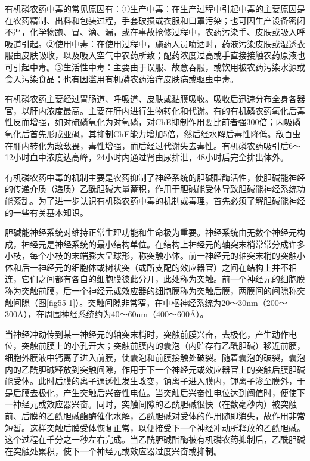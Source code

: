 有机磷农药中毒的常见原因有：①生产中毒：在生产过程中引起中毒的主要原因是在农药精制、出料和包装过程，手套破损或衣服和口罩污染；也可因生产设备密闭不严，化学物跑、冒、滴、漏，或在事故抢修过程中，农药污染手、皮肤或吸入呼吸道引起。②使用中毒：在使用过程中，施药人员喷洒时，药液污染皮肤或湿透衣服由皮肤吸收，以及吸入空气中农药所致；配药浓度过高或手直接接触农药原液也可引起中毒。③生活性中毒：主要由于误服、故意吞服，或饮用被农药污染水源或食入污染食品；也有因滥用有机磷农药治疗皮肤病或驱虫中毒。

有机磷农药主要经过胃肠道、呼吸道、皮肤或黏膜吸收。吸收后迅速分布全身各器官，以肝内浓度最高。主要在肝内进行生物转化和代谢。有的有机磷农药氧化后毒性反而增强，如对硫磷氧化为对氧磷，对ChE抑制作用要比前者强300倍；内吸磷氧化后首先形成亚砜，其抑制ChE能力增加5倍，然后经水解后毒性降低。敌百虫在肝内转化为敌敌畏，毒性增强，而后经过代谢失去毒性。有机磷农药吸引后6～12小时血中浓度达高峰，24小时内通过肾由尿排泄，48小时后完全排出体外。

有机磷农药中毒的机制主要是农药抑制了神经系统的胆碱酯酶活性，使胆碱能神经的传递介质（递质）乙酰胆碱大量蓄积，作用于胆碱能受体导致胆碱能神经系统功能紊乱。为了进一步认识有机磷农药中毒的机制或毒理，首先必须了解胆碱能神经的一些有关基本知识。

胆碱能神经系统对维持正常生理功能和生命极为重要。神经系统由无数个神经元构成，神经元是神经系统的最小结构单位。在结构上神经元的轴突末梢常常分成许多小枝，每个小枝的末端膨大呈球形，称突触小体。前一神经元的轴突末梢的突触小体和后一神经元的细胞体或树状突（或所支配的效应器官）之间在结构上并不相连，它们之间都有各自的细胞膜彼此分开，此处称为突触。前一个神经元的细胞膜称为突触前膜，后一个神经元或效应器的细胞膜称为突触后膜，两膜间的间隙称突触间隙（图\ref{fig55-1}）。突触间隙非常窄，在中枢神经系统为20～30nm（200～300Å），在周围神经系统约为40～60nm（400～600Å）。

当神经冲动传到某一神经元的轴突末梢时，突触前膜兴奋，去极化，产生动作电位，突触前膜上的小孔开大；突触前膜内的囊泡（内贮存有乙酰胆碱）移近前膜，细胞外膜液中钙离子进入前膜，使囊泡和前膜接触处破裂。随着囊泡的破裂，囊泡内的乙酰胆碱释放到突触间隙，作用于下一个神经元或效应器官上的突触后膜胆碱能受体。此时后膜的离子通透性发生改变，钠离子进入膜内，钾离子渗至膜外，于是后膜去极化，产生突触后兴奋性电位。当突触后兴奋性电位达到阈值时，便使下一神经元或效应器兴奋。同时，突触间隙的乙酰胆碱很快（在数毫秒内）被突触前、后膜的乙酰胆碱酯酶催化水解，乙酰胆碱对受体的作用随即消失，故作用非常短暂。这样突触后膜受体恢复正常，以便接受下一个神经冲动所释放的乙酰胆碱。这个过程在千分之一秒左右完成。当乙酰胆碱酯酶被有机磷农药抑制后，乙酰胆碱在突触处累积，使下一个神经元或效应器过度兴奋或抑制。

